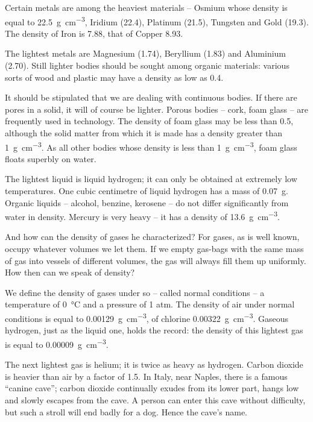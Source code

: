 Certain metals are among the heaviest materials -- Osmium whose
density is equal to \SI{22.5}{\gram\per\cm^{3}}, Iridium (22.4), Platinum (21.5),
Tungsten and Gold (19.3). The density of Iron is 7.88, that of Copper
8.93.  

The lightest metals are Magnesium (1.74), Beryllium (1.83) and
Aluminium (2.70). Still lighter bodies should be sought among organic
materials: various sorts of wood and plastic may have a density as low
as 0.4.  

It should be stipulated that we are dealing with continuous bodies. If
there are pores in a solid, it will of course be lighter. Porous
bodies -- cork, foam glass -- are frequently used in technology. The
density of foam glass may be less than 0.5, although the solid matter
from which it is made has a density greater than
\SI{1}{\gram\per\cm^{3}}. As all other bodies whose density is less
than \SI{1}{\gram\per\cm^{3}}, foam glass floats superbly on water.

The lightest liquid is liquid hydrogen; it can only be obtained at
extremely low temperatures. One cubic centimetre of liquid hydrogen
has a mass of \SI{0.07}{\gram}. Organic liquids -- alcohol, benzine,
kerosene -- do
not differ significantly from water in density. Mercury is very
heavy -- it has a density of \SI{13.6}{\gram\per\cm^{3}}. 

And how can the density of gases he characterized? For gases, as is
well known, occupy whatever volumes we let them. If we empty gas-bags
with the same mass of gas into vessels of different volumes, the gas
will always fill them up uniformly. How then can we speak of density?


We define the density of gases under so -- called normal conditions --
a temperature of \SI{0}{\celsius} and a pressure of 1 atm. The
density of air under normal conditions is equal to
\SI{0.00129}{\gram\per\cm^{3}}, of chlorine
\SI{0.00322}{\gram\per\cm^{3}}.  Gaseous hydrogen, just as the liquid
one, holds the record: the density of this lightest gas is equal to
\SI{0.00009}{\gram\per\cm^{3}}.

The next lightest gas is helium; it is twice as heavy as
hydrogen. Carbon dioxide is heavier than air by a factor of 1.5. In
Italy, near Naples, there is a famous ``canine cave''; carbon dioxide
continually exudes from its lower part, hangs low and slowly escapes
from the cave. A person can enter this cave without difficulty, but
such a stroll will end badly for a dog. Hence the cave's name.  

